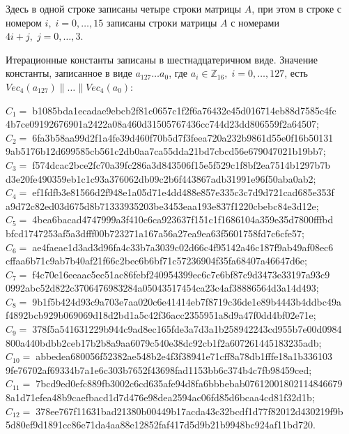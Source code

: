 \par
Здесь в одной строке записаны четыре строки матрицы $A$, при этом в строке с номером $i,\;i=0,\dots,15$ записаны строки матрицы $A$ с номерами $4 i + j,\;j=0,\dots,3$.
\par
Итерационные константы записаны в шестнадцатеричном виде. Значение константы, записанное в виде $a_{127}\dots a_0$, где $a_i\in \mathbb{Z}_{16},\; i=0,\dots,127$, есть $Vec_4(a_{127})\|\dots\|Vec_4(a_0)$:
\begin{center}
$C_{1}=\;$b1085bda1ecadae9ebcb2f81c0657c1f2f6a76432e45d016714eb88d7585c4fc\\4b7ce09192676901a2422a08a460d31505767436cc744d23dd806559f2a64507;\\
$C_{2}=\;$6fa3b58aa99d2f1a4fe39d460f70b5d7f3feea720a232b9861d55e0f16b50131\\9ab5176b12d699585cb561c2db0aa7ca55dda21bd7cbcd56e679047021b19bb7;\\
$C_{3}=\;$f574dcac2bce2fc70a39fc286a3d843506f15e5f529c1f8bf2ea7514b1297b7b\\d3e20fe490359eb1c1c93a376062db09c2b6f443867adb31991e96f50aba0ab2;\\
$C_{4}=\;$ef1fdfb3e81566d2f948e1a05d71e4dd488e857e335c3c7d9d721cad685e353f\\a9d72c82ed03d675d8b71333935203be3453eaa193e837f1220cbebc84e3d12e;\\
$C_{5}=\;$4bea6bacad4747999a3f410c6ca923637f151c1f1686104a359e35d7800fffbd\\bfcd1747253af5a3dfff00b723271a167a56a27ea9ea63f5601758fd7c6cfe57;\\
$C_{6}=\;$ae4faeae1d3ad3d96fa4c33b7a3039c02d66c4f95142a46c187f9ab49af08ec6\\cffaa6b71c9ab7b40af21f66c2bec6b6bf71c57236904f35fa68407a46647d6e;\\
$C_{7}=\;$f4c70e16eeaac5ec51ac86febf240954399ec6c7e6bf87c9d3473e33197a93c9\\0992abc52d822c3706476983284a05043517454ca23c4af38886564d3a14d493;\\
$C_{8}=\;$9b1f5b424d93c9a703e7aa020c6e41414eb7f8719c36de1e89b4443b4ddbc49a\\f4892bcb929b069069d18d2bd1a5c42f36acc2355951a8d9a47f0dd4bf02e71e;\\
$C_{9}=\;$378f5a541631229b944c9ad8ec165fde3a7d3a1b258942243cd955b7e00d0984\\800a440bdbb2ceb17b2b8a9aa6079c540e38dc92cb1f2a607261445183235adb;\\
$C_{10}=\;$abbedea680056f52382ae548b2e4f3f38941e71cff8a78db1fffe18a1b336103\\9fe76702af69334b7a1e6c303b7652f43698fad1153bb6c374b4c7fb98459ced;\\
$C_{11}=\;$7bcd9ed0efc889fb3002c6cd635afe94d8fa6bbbebab07612001802114846679\\8a1d71efea48b9caefbacd1d7d476e98dea2594ac06fd85d6bcaa4cd81f32d1b;\\
$C_{12}=\;$378ee767f11631bad21380b00449b17acda43c32bcdf1d77f82012d430219f9b\\5d80ef9d1891cc86e71da4aa88e12852faf417d5d9b21b9948bc924af11bd720.\\
\end{center}
\begin{equation}\label{ca}
\end{equation}
